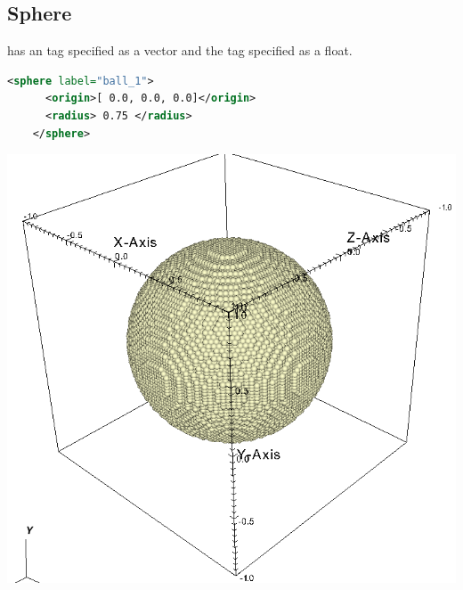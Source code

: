 \subsection{Sphere}
\begin{minipage}{0.6\textwidth}
   has an  tag specified as a vector and the
   tag specified as a float.
  \begin{lstlisting}[language=XML]
    <sphere label="ball_1">
      <origin>[ 0.0, 0.0, 0.0]</origin>
      <radius> 0.75 </radius>
    </sphere>
  \end{lstlisting}
\end{minipage}
\begin{minipage}{0.4\textwidth}
  \centering
  \includegraphics[width=0.9\columnwidth]{FIGS/geometry/geom_sphere.png}
\end{minipage}

